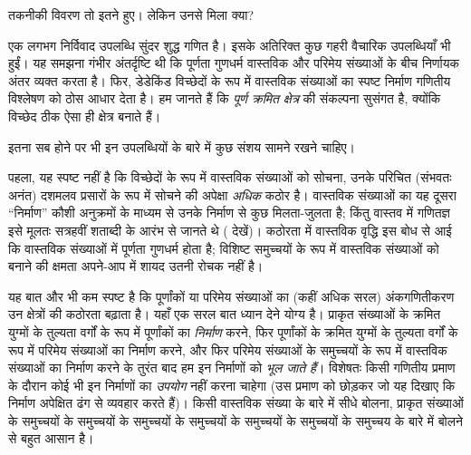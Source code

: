 \documentclass[../../../include/open-logic-section]{subfiles}
\begin{document}

तकनीकी विवरण तो इतने हुए। लेकिन उनसे मिला क्या?

एक लगभग निर्विवाद उपलब्धि सुंदर शुद्ध गणित है। इसके अतिरिक्त कुछ गहरी
वैचारिक उपलब्धियाँ भी हुईं। यह समझना गंभीर अंतर्दृष्टि थी कि पूर्णता गुणधर्म
वास्तविक और परिमेय संख्याओं के बीच निर्णायक अंतर व्यक्त करता है। फिर,
डेडेकिंड विच्छेदों के रूप में वास्तविक संख्याओं का स्पष्ट निर्माण गणितीय
विश्लेषण को ठोस आधार देता है। हम जानते हैं कि \emph{पूर्ण क्रमित क्षेत्र} की
संकल्पना सुसंगत है, क्योंकि विच्छेद ठीक ऐसा ही क्षेत्र बनाते हैं।

इतना सब होने पर भी इन उपलब्धियों के बारे में कुछ संशय सामने रखने चाहिए।

पहला, यह स्पष्ट नहीं है कि विच्छेदों के रूप में वास्तविक संख्याओं को सोचना,
उनके परिचित (संभवतः अनंत) दशमलव प्रसारों के रूप में सोचने की अपेक्षा
\emph{अधिक} कठोर है। वास्तविक संख्याओं का यह दूसरा ``निर्माण'' कौशी अनुक्रमों
के माध्यम से उनके निर्माण से कुछ मिलता-जुलता है; किंतु वास्तव में गणितज्ञ इसे
मूलतः सत्रहवीं शताब्दी के आरंभ से जानते थे ( देखें)।
कठोरता में वास्तविक वृद्धि इस बोध से आई कि वास्तविक संख्याओं में पूर्णता
गुणधर्म होता है; विशिष्ट समुच्चयों के रूप में वास्तविक संख्याओं को बनाने की
क्षमता अपने-आप में शायद उतनी रोचक नहीं है।

यह बात और भी कम स्पष्ट है कि पूर्णांकों या परिमेय संख्याओं का (कहीं अधिक सरल)
अंकगणितीकरण उन क्षेत्रों की कठोरता बढ़ाता है। यहाँ एक सरल बात ध्यान देने योग्य
है। प्राकृत संख्याओं के क्रमित युग्मों के तुल्यता वर्गों के रूप में पूर्णांकों
का \emph{निर्माण} करने, फिर पूर्णांकों के क्रमित युग्मों के तुल्यता वर्गों के
रूप में परिमेय संख्याओं का निर्माण करने, और फिर परिमेय संख्याओं के समुच्चयों
के रूप में वास्तविक संख्याओं का निर्माण करने के तुरंत बाद हम इन निर्माणों को
\emph{भूल जाते हैं}। विशेषतः किसी गणितीय प्रमाण के दौरान कोई भी इन निर्माणों
का \emph{उपयोग} नहीं करना चाहेगा (उस प्रमाण को छोड़कर जो यह दिखाए कि निर्माण
अपेक्षित ढंग से व्यवहार करते हैं)। किसी वास्तविक संख्या के बारे में सीधे
बोलना, प्राकृत संख्याओं के समुच्चयों के समुच्चयों के समुच्चयों के समुच्चयों के
समुच्चयों के समुच्चयों के समुच्चय के बारे में बोलने से बहुत आसान है।
%
%
%
	
\end{document}
